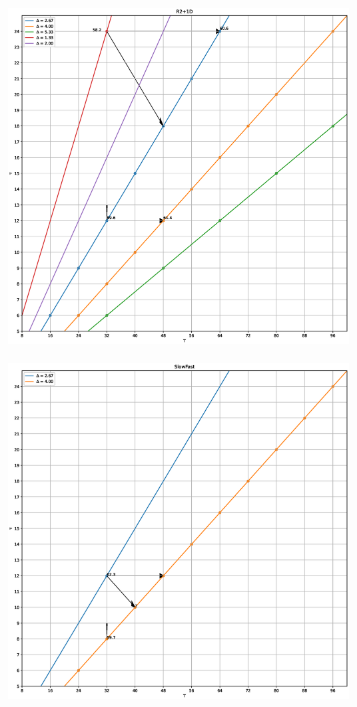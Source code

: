 \begin{figure}
    \centering
    \begin{subfigure}{.33\textwidth}
        \centering
        \includegraphics[width=0.99\textwidth, height=0.8\textwidth, keepaspectratio, interpolate]{img/07_grid_r2plus1d.eps}
    \end{subfigure}%
    \begin{subfigure}{.33\textwidth}
        \centering
        \includegraphics[width=0.99\textwidth, height=0.8\textwidth, keepaspectratio, interpolate]{img/07_grid_slowfast.eps}
    \end{subfigure}

\end{figure}
